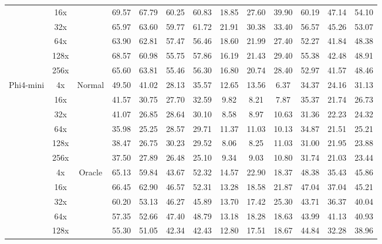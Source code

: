\documentclass{applemlr}
\numberwithin{equation}{section}
\begin{document}
\begin{table}[H]
\begin{tabular}{c|c|c|cc|cc|cc|cc|cc}
   & 16x &  & 69.57 & 67.79 & 60.25 & 60.83 & 18.85 & 27.60 & 39.90 & 60.19 & 47.14 & 54.10 \\

  & 32x &  & 65.97 & 63.60 & 59.77 & 61.72 & 21.91 & 30.38 & 33.40 & 56.57 & 45.26 & 53.07 \\

   & 64x &  & 63.90 & 62.81 & 57.47 & 56.46 & 18.60 & 21.99 & 27.40 & 52.27 & 41.84 & 48.38 \\

   & 128x &  & 68.57 & 60.98 & 55.75 & 57.86 & 16.19 & 21.43 & 29.40 & 55.38 & 42.48 & 48.91 \\

   & 256x &  & 65.60 & 63.81 & 55.46 & 56.30 & 16.80 & 20.74 & 28.40 & 52.97 & 41.57 & 48.46 \\
\hline 
 \multirow{12}{*}{Phi4-mini} & 4x & \multirow{6}{*}{Normal}  & 49.50 & 41.02 & 28.13 & 35.57 & 12.65 & 13.56 & 6.37 & 34.37 & 24.16 & 31.13 \\
  & 16x &  & 41.57 & 30.75 & 27.70 & 32.59 & 9.82 & 8.21 & 7.87 & 35.37 & 21.74 & 26.73 \\
  & 32x &  & 41.07 & 26.85 & 28.64 & 30.10 & 8.58 & 8.97 & 10.63 & 31.36 & 22.23 & 24.32 \\

  & 64x &  & 35.98 & 25.25 & 28.57 & 29.71 & 11.37 & 11.03 & 10.13 & 34.87 & 21.51 & 25.21 \\

  & 128x &  & 38.47 & 26.75 & 30.23 & 29.52 & 8.06 & 8.25 & 11.03 & 31.00 & 21.95 & 23.88 \\

  & 256x &  & 37.50 & 27.89 & 26.48 & 25.10 & 9.34 & 9.03 & 10.80 & 31.74 & 21.03 & 23.44 \\
\cline{2-13}
       & 4x & \multirow{6}{*}{Oracle}  & 65.13 & 59.84 & 43.67 & 52.32 & 14.57 & 22.90 & 18.37 & 48.38 & 35.43 & 45.86 \\

   & 16x &  & 66.45 & 62.90 & 46.57 & 52.31 & 13.28 & 18.58 & 21.87 & 47.04 & 37.04 & 45.21 \\

   & 32x &  & 60.20 & 53.13 & 46.27 & 45.89 & 13.70 & 17.42 & 25.30 & 43.71 & 36.37 & 40.04 \\

   & 64x &  & 57.35 & 52.66 & 47.40 & 48.79 & 13.18 & 18.28 & 18.63 & 43.99 & 41.13 & 40.93 \\

   & 128x &  & 55.30 & 51.05 & 42.34 & 42.43 & 12.80 & 17.51 & 18.67 & 44.84 & 32.28 & 38.96 \\


\end{tabular}
\end{table}
\end{document}

